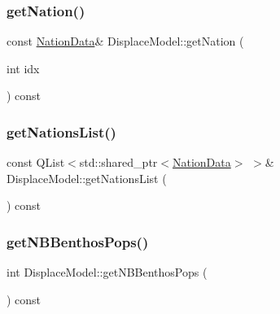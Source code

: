 \mbox{\label{class_displace_model_a012e026bf7d17c416b678154a60ab451}} 
\subsubsection{\texorpdfstring{getNation()}{getNation()}}
{\footnotesize\ttfamily const \mbox{\hyperlink{class_nation_data}{Nation\+Data}}\& Displace\+Model\+::get\+Nation (\begin{DoxyParamCaption}\item[{int}]{idx }\end{DoxyParamCaption}) const\hspace{0.3cm}{\ttfamily [inline]}}

\mbox{\label{class_displace_model_a4ad574a85bf902e2af3b2bb99f9b0cd6}} 
\subsubsection{\texorpdfstring{getNationsList()}{getNationsList()}}
{\footnotesize\ttfamily const Q\+List$<$std\+::shared\+\_\+ptr$<$\mbox{\hyperlink{class_nation_data}{Nation\+Data}}$>$ $>$\& Displace\+Model\+::get\+Nations\+List (\begin{DoxyParamCaption}{ }\end{DoxyParamCaption}) const\hspace{0.3cm}{\ttfamily [inline]}}

\mbox{\label{class_displace_model_a3092d43ebcf8f284d0cd005c9997acc8}} 
\subsubsection{\texorpdfstring{getNBBenthosPops()}{getNBBenthosPops()}}
{\footnotesize\ttfamily int Displace\+Model\+::get\+N\+B\+Benthos\+Pops (\begin{DoxyParamCaption}{ }\end{DoxyParamCaption}) const\hspace{0.3cm}{\ttfamily [inline]}}

